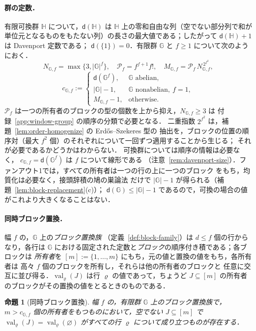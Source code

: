 \documentclass[11pt,a4paper]{ltjsarticle}
\numberwithin{equation}{section}
\theoremstyle{plain}
\newtheorem{proposition}[theorem]{命題}
\theoremstyle{definition}
\theoremstyle{remark}
\theoremstyle{plain}
\begin{document}
\paragraph{群の定数．}
有限可換群 ${\mathbb H}$ について，$\mathsf d({\mathbb H})$ は
${\mathbb H}$ 上の零和自由な列（空でない部分列で和が
単位元となるものをもたない列）の長さの最大値である；したがって $\mathsf d({\mathbb H})+1$ は Davenport 定数である；
$\mathsf d(\{1\})=0$．有限群 ${\mathbb G}$ と $f\ge1$ について次のようにおく．
\[
 N_{{\mathbb G},f}=\max\{3,|{\mathbb G}|^f\},\quad
 \mathcal P_f=f^{f+1}f!,\quad
 M_{{\mathbb G},f}=\mathcal P_f\,N_{{\mathbb G},f}^{\,2^{f^2}},
\]
\[
 c_{{\mathbb G},f}:=
 \begin{cases}
 \mathsf d({\mathbb G}^f),&{\mathbb G}\text{ abelian},\\
 |{\mathbb G}|-1,&{\mathbb G}\text{ nonabelian},\ f=1,\\
 M_{{\mathbb G},f}-1,&\text{otherwise}.
 \end{cases}
\]
$\mathcal P_f$ は一つの所有者のブロックの型の個数を上から抑え，$N_{{\mathbb G},f}\ge3$ は
付録~\ref{app:window-group} の順序の分類で必要となる．
二重指数 $2^{f^2}$ は，補題~\ref{lem:order-homogenize} の Erd\H{o}s--Szekeres 型の
抽出を，ブロックの位置の順序対（最大 $f^2$ 個）のそれぞれについて一回ずつ適用することから生じる；
それが必要であるかどうかはわからない．
可換群については順序の情報は必要なく，
$c_{{\mathbb G},f}=\mathsf d({\mathbb G}^f)$ は $f$ について線形である
（注意~\ref{rem:davenport-size}）．ファンアウト1では，すべての所有者は一つの行の上に一つのブロック
をもち，均質化は必要なく，接頭辞積の鳩の巣論法
だけで $|{\mathbb G}|-1$ が得られる（補題~\ref{lem:block-replacement}(c)）；
$\mathsf d({\mathbb G})\le|{\mathbb G}|-1$ であるので，可換の場合の値がこれより大きくなることはない．

\paragraph{同時ブロック置換．}
幅 $f$ の，${\mathbb G}$ 上の\emph{ブロック置換族}
（定義~\ref{def:block-family}）は $d\le f$ 個の行からなり，各行は
${\mathbb G}$ における固定された定数と\emph{ブロック}の順序付き積である；各ブロックは
\emph{所有者}を $[m]:=\{1,\ldots,m\}$ にもち，元の値と置換の値をもち，各所有者は
高々 $f$ 個のブロックを所有し，それらは他の所有者のブロックと
任意に交互に並び得る．$\operatorname{val}_\varrho(J)$ は行 $\varrho$ の値であって，ちょうど
$J\subseteq[m]$ の所有者のブロックがその置換の値をとるときのものである．

\begin{proposition}[同時ブロック置換]
\label{prop:block-replacement-interface}
幅 $f$ の，有限群 ${\mathbb G}$ 上のブロック置換族で，
$m>c_{{\mathbb G},f}$ 個の所有者をもつものにおいて，空でない $J\subseteq[m]$ で
$\operatorname{val}_\varrho(J)=\operatorname{val}_\varrho(\varnothing)$ がすべての行 $\varrho$ について成り立つものが存在する．
\end{proposition}
\end{document}
